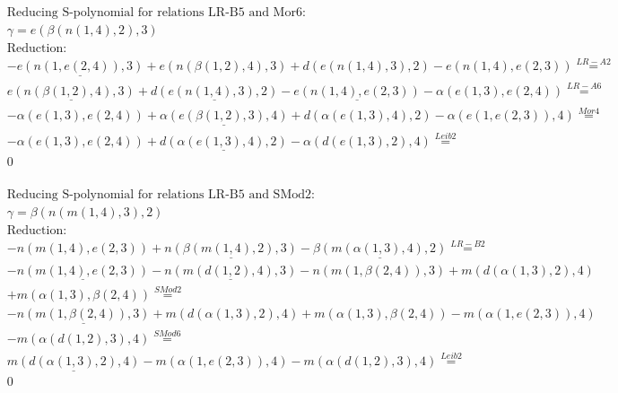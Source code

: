 \documentclass[11pt]{amsart}
\begin{document}
\begin{align*} 
& \text{Reducing S-polynomial for relations LR-B5 and Mor6:} \\ 
& \gamma = e(\beta(n(1,4),2),3) \\ 
& \text{Reduction}: \\& - \underline{e(n(1,e(2,4)),3)} + e(n(\beta(1,2),4),3) + d(e(n(1,4),3),2) - e(n(1,4),e(2,3)) \stackrel{ LR-A2 }{=}  \\ 
&\underline{e(n(\beta(1,2),4),3)} + \underline{d(e(n(1,4),3),2)} - \underline{e(n(1,4),e(2,3))} - \alpha(e(1,3),e(2,4)) \stackrel{ LR-A6 }{=}  \\ 
& - \alpha(e(1,3),e(2,4)) + \underline{\alpha(e(\beta(1,2),3),4)} + d(\alpha(e(1,3),4),2) - \alpha(e(1,e(2,3)),4) \stackrel{ Mor4 }{=}  \\ 
& - \alpha(e(1,3),e(2,4)) + \underline{d(\alpha(e(1,3),4),2)} - \alpha(d(e(1,3),2),4) \stackrel{ Leib2 }{=}  \\ 
&0\\ 
\end{align*} 
 
\begin{align*} 
& \text{Reducing S-polynomial for relations LR-B5 and SMod2:} \\ 
& \gamma = \beta(n(m(1,4),3),2) \\ 
& \text{Reduction}: \\& - n(m(1,4),e(2,3)) + \underline{n(\beta(m(1,4),2),3)} - \underline{\beta(m(\alpha(1,3),4),2)} \stackrel{ LR-B2 }{=}  \\ 
& - \underline{n(m(1,4),e(2,3))} - \underline{n(m(d(1,2),4),3)} - n(m(1,\beta(2,4)),3) + m(d(\alpha(1,3),2),4)\\ 
 &  + m(\alpha(1,3),\beta(2,4)) \stackrel{ SMod2 }{=}  \\ 
& - \underline{n(m(1,\beta(2,4)),3)} + m(d(\alpha(1,3),2),4) + m(\alpha(1,3),\beta(2,4)) - m(\alpha(1,e(2,3)),4)\\ 
 &  - m(\alpha(d(1,2),3),4) \stackrel{ SMod6 }{=}  \\ 
&\underline{m(d(\alpha(1,3),2),4)} - m(\alpha(1,e(2,3)),4) - m(\alpha(d(1,2),3),4) \stackrel{ Leib2 }{=}  \\ 
&0\\ 
\end{align*} 
 
\end{document}

